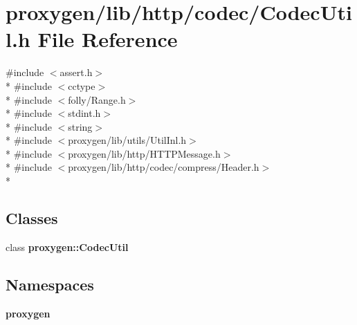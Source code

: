 \section{proxygen/lib/http/codec/\+Codec\+Util.h File Reference}
\label{CodecUtil_8h}
{\ttfamily \#include $<$assert.\+h$>$}\\*
{\ttfamily \#include $<$cctype$>$}\\*
{\ttfamily \#include $<$folly/\+Range.\+h$>$}\\*
{\ttfamily \#include $<$stdint.\+h$>$}\\*
{\ttfamily \#include $<$string$>$}\\*
{\ttfamily \#include $<$proxygen/lib/utils/\+Util\+Inl.\+h$>$}\\*
{\ttfamily \#include $<$proxygen/lib/http/\+H\+T\+T\+P\+Message.\+h$>$}\\*
{\ttfamily \#include $<$proxygen/lib/http/codec/compress/\+Header.\+h$>$}\\*
\subsection*{Classes}
\begin{DoxyCompactItemize}
\item 
class {\bf proxygen\+::\+Codec\+Util}
\end{DoxyCompactItemize}
\subsection*{Namespaces}
\begin{DoxyCompactItemize}
\item 
 {\bf proxygen}
\end{DoxyCompactItemize}
